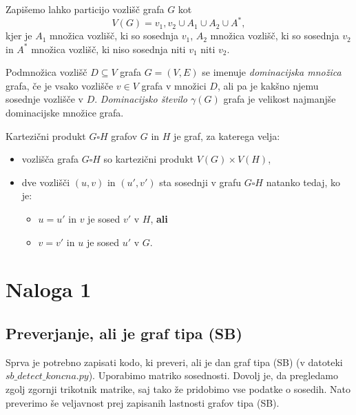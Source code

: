 \documentclass{article}
\begin{document}
Zapišemo lahko particijo vozlišč grafa $G$ kot $$V(G) = {v_1, v_2} \cup A_1 \cup A_2 \cup A^*,$$
kjer je $A_1$ množica vozlišč, ki so sosednja $v_1$, $A_2$ množica vozlišč, ki so sosednja $v_2$ in 
$A^*$ množica vozlišč, ki niso sosednja niti $v_1$ niti $v_2$.

\begin{definition}
   Podmnožica vozlišč $D\subseteq V$ grafa $G=(V,E)$ se imenuje \emph{dominacijska množica} grafa,
   če je vsako vozlišče $v\in V$ grafa v množici $D$, ali pa je kakšno njemu sosednje vozlišče
   v $D$. \emph{Dominacijsko število $\gamma(G)$} grafa je velikost najmanjše dominacijske
   množice grafa.
\end{definition}

\begin{definition}
    Kartezični produkt $G\square H$ grafov $G$ in $H$ je graf, za katerega velja:
    \begin{itemize}
        \item vozlišča grafa $G\square H$ so kartezični produkt $V(G)\times V(H)$,
        \item dve vozlišči $(u,v)$ in $(u',v')$ sta sosednji v grafu $G\square H$ natanko tedaj, ko je:
        \begin{itemize}
            \item $u=u'$ in $v$ je sosed $v'$ v $H$, \textbf{ali}
            \item $v=v'$ in $u$ je sosed $u'$ v $G$.
        \end{itemize}
    \end{itemize}
\end{definition}

\section{Naloga 1}
\subsection{Preverjanje, ali je graf tipa (SB)}
Sprva je potrebno zapisati kodo, ki preveri, ali je dan graf tipa (SB) (v datoteki $sb\_detect\_koncna.py$). Uporabimo matriko sosednosti. Dovolj je, 
da pregledamo zgolj zgornji trikotnik matrike, saj tako že pridobimo vse podatke o sosedih. Nato 
preverimo še veljavnost prej zapisanih lastnosti grafov tipa (SB).
\end{document}
